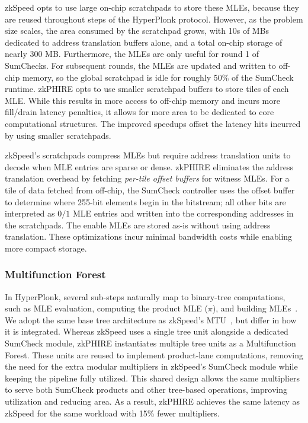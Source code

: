 zkSpeed opts to use large on-chip scratchpads to store these MLEs, because they are reused throughout steps of the HyperPlonk protocol.
However, as the problem size scales, the area consumed by the scratchpad grows, with 10s of MBs dedicated to address translation buffers alone, and a total on-chip storage of nearly 300 MB.
Furthermore, the MLEs are only useful for round 1 of SumChecks. For subsequent rounds, the MLEs are updated and written to off-chip memory, so the global scratchpad is idle for roughly 50\% of the SumCheck runtime.
zkPHIRE opts to use smaller scratchpad buffers to store tiles of each MLE.
While this results in more access to off-chip memory and incurs more fill/drain latency penalties, it allows for more area to be dedicated to core computational structures. The improved speedups offset the latency hits incurred by using smaller scratchpads. 

zkSpeed's scratchpads compress MLEs but require address translation units to decode when MLE entries are sparse or dense. zkPHIRE eliminates the address translation overhead by fetching \textit{per-tile offset buffers} for witness MLEs.
For a tile of data fetched from off-chip, the SumCheck controller uses the offset buffer to determine where 255-bit elements begin in the bitstream; all other bits are interpreted as $0/1$ MLE entries and written into the corresponding addresses in the scratchpads.
The enable MLEs are stored as-is without using address translation. 
These optimizations incur minimal bandwidth costs while enabling more compact storage.



\subsubsection{\textbf{Multifunction Forest}}
In HyperPlonk, several sub-steps naturally map to binary-tree computations, such as MLE evaluation, computing the product MLE ($\pi$), and building MLEs~\cite{mo2025mtu}. 
We adopt the same base tree architecture as zkSpeed's MTU~\cite{mo2025mtu, zkspeed2025}, but differ in how it is integrated.
Whereas zkSpeed uses a single tree unit alongside a dedicated SumCheck module, zkPHIRE instantiates multiple tree units as a Multifunction Forest.
These units are reused to implement product-lane computations, removing the need for the extra modular multipliers in zkSpeed’s SumCheck module while keeping the pipeline fully utilized.
This shared design allows the same multipliers to serve both SumCheck products and other tree-based operations, improving utilization and reducing area.
As a result, zkPHIRE achieves the same latency as zkSpeed for the same workload with 15\% fewer multipliers.


